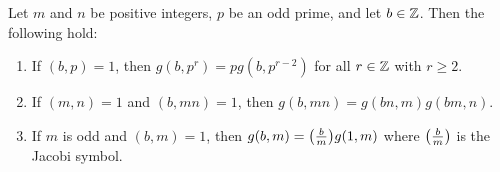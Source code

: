         \begin{proposition}\label{prop:quadratic_Gauss_sum_reduction}
          Let $m$ and $n$ be positive integers, $p$ be an odd prime, and let $b \in \mathbb{Z}$. Then the following hold:
          \begin{enumerate}[label=(\roman*)]
            \item If $(b,p) = 1$, then $g(b,p^{r}) = pg(b,p^{r-2})$ for all $r \in \mathbb{Z}$ with $r \ge 2$.
            \item If $(m,n) = 1$ and $(b,mn) = 1$, then $g(b,mn) = g(bn,m)g(bm,n)$.
            \item If $m$ is odd and $(b,m) = 1$, then $g(b,m) = \textstyle{\left(\frac{b}{m}\right)}g(1,m)$ where $\textstyle{\left(\frac{b}{m}\right)}$ is the Jacobi symbol.
          \end{enumerate}
        \end{proposition}
